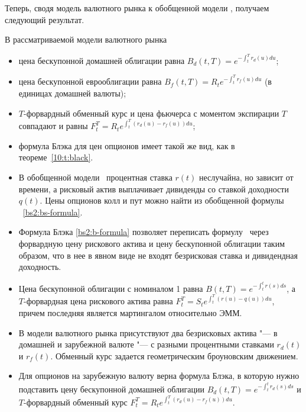 Теперь, сводя модель валютного рынка к обобщенной модели \bs, получаем следующий результат.
\begin{proposition}
В рассматриваемой модели валютного рынка
\begin{itemize}
\item цена бескупонной домашней облигации равна $B_d(t,T) = e^{-\int_t^T r_d(u) du}$;
\item цена бескупонной еврооблигации равна $B_f(t,T) = R_t e^{-\int_t^T r_f(u) du}$ (в единицах домашней валюты);
\item $T$-форвардный обменный курс и цена фьючерса с моментом экспирации $T$ совпадают и равны $F_t^T = R_t e^{\int_t^T (r_d(u)-r_f(u)) du}$;
\item формула Блэка для цен опционов имеет такой же вид, как в теореме~\ref{10:t:black}.
\end{itemize}
\end{proposition}


\summary
\begin{itemize}
\item В обобщенной модели \bs\ процентная ставка $r(t)$ неслучайна, но зависит от времени, а рисковый актив выплачивает дивиденды со ставкой доходности $q(t)$. Цены опционов колл и пут можно найти из обобщенной формулы \bs\ \eqref{bs2:bs-formula}.

\item Формула Блэка \eqref{bs2:b-formula} позволяет переписать формулу \bs\ через форвардную цену рискового актива и цену бескупонной облигации таким образом, что в нее в явном виде не входят безрисковая ставка и дивидендная доходность.

\item Цена бескупонной облигации с номиналом 1 равна $B(t,T) = e^{-\int_t^t r(s) ds}$, а $T$-форвардная цена рискового актива равна $F_t^T = S_t e^{\int_t^T (r(u)-q(u)) du}$, причем последняя является мартингалом относительно ЭММ. 

\item В модели валютного рынка присутствуют два безрисковых актива "--- в домашней и зарубежной валюте "--- с разными процентными ставками $r_d(t)$ и $r_f(t)$.
Обменный курс задается геометрическим броуновским движением. 

\item Для опционов на зарубежную валюту верна формула Блэка, в которую нужно подставить цену бескупонной домашней облигации $B_d(t,T) = e^{-\int_t^t r_d(s) ds}$ и $T$-форвардный обменный курс $F_t^T = R_t e^{\int_t^T (r_d(u)-r_f(u)) du}$.
\end{itemize}
